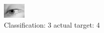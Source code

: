 \begin{figure}[h!]
\begin{center}
\includegraphics[width=0.60\columnwidth]{figures/ID2983_class_3_target_4.png}
\end{center}
\caption{ Classification: 3 actual target: 4}
\label{fig:ID2983_class_3_target_4}
\end{figure}
